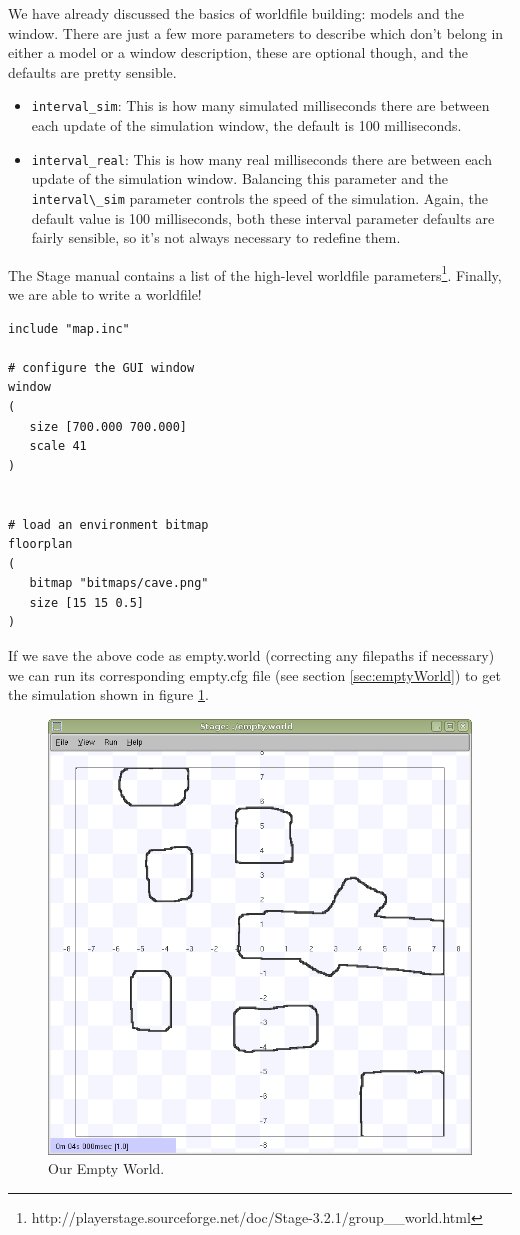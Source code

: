 \documentclass[a4paper]{report}
\begin{document}
We have already discussed the basics of worldfile building: models and the window. There are just a few more parameters to describe which don't belong in either a model or a window description, these are optional though, and the defaults are pretty sensible.
\begin{itemize}
\item \verb|interval_sim|: This is how many simulated milliseconds there are between each update of the simulation window, the default is 100 milliseconds.
\item \verb|interval_real|: This is how many real milliseconds there are between each update of the simulation window. Balancing this parameter and the \verb|interval\_sim| parameter controls the speed of the simulation. Again, the default value is 100 milliseconds, both these interval parameter defaults are fairly sensible, so it's not always necessary to redefine them.
\end{itemize}
The Stage manual contains a list of the high-level worldfile parameters\footnote{http://playerstage.sourceforge.net/doc/Stage-3.2.1/group\_\_world.html}.\newline
Finally, we are able to write a worldfile!
\begin{verbatim}
include "map.inc"

# configure the GUI window
window
( 
   size [700.000 700.000] 
   scale 41
)


# load an environment bitmap
floorplan
(
   bitmap "bitmaps/cave.png" 
   size [15 15 0.5]
)
\end{verbatim}
If we save the above code as empty.world (correcting any filepaths if necessary) we can run its corresponding empty.cfg file (see section \ref{sec:emptyWorld}) to get the simulation shown in figure \ref{fig:finalEmptyWorld}.

\begin{figure}
	\centering
	\includegraphics[width=0.7\linewidth]{./pics/empty_world/finalEmptyWorld.png} 
	\caption{Our Empty World.}
	\label{fig:finalEmptyWorld}
\end{figure}
\end{document}
